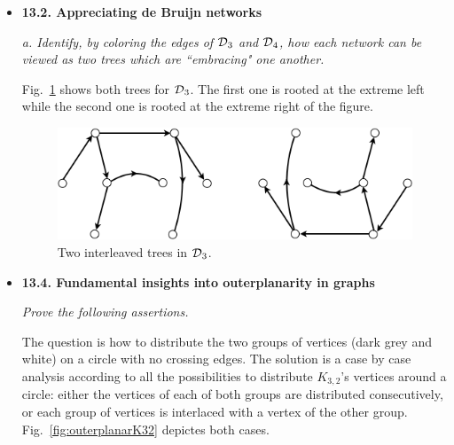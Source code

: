 \vspace{1in}
\begin{itemize}
\item
{\bf 13.2. Appreciating de Bruijn networks}
\smallskip


\noindent
{\em a. Identify, by coloring the edges of $\mbox{$\cal D$}_3$ and $\mbox{$\cal D$}_4$, how each network can be viewed as two trees which are ``embracing" one another.}

\smallskip

Fig.~\ref{fig:DeBruijn3Tree} shows both trees for $\mbox{$\cal D$}_3$. 
The first one is rooted at the extreme left while the second one is rooted at the extreme right of the figure. 
\begin{figure}[h]
\begin{center}
        \includegraphics[scale=0.4]{FiguresGraph/DeBruijn3Tree}
        \caption{Two interleaved trees in $\mbox{$\cal D$}_3$.}
        \label{fig:DeBruijn3Tree}
\end{center}
\end{figure}


\medskip\item 
{\bf 13.4. Fundamental insights into outerplanarity in graphs}
\smallskip

{\em Prove the following assertions.}

\smallskip

The question is how to distribute the two groups of vertices (dark grey and white) on a circle
with no crossing edges.
The solution is a case by case analysis according to all the possibilities to distribute $K_{3,2}$'s vertices around a circle:
either the vertices of each of both groups are distributed consecutively, or each group of vertices is interlaced with a vertex of the other group.
Fig.~\ref{fig:outerplanarK32} depictes both cases.


\end{itemize}
